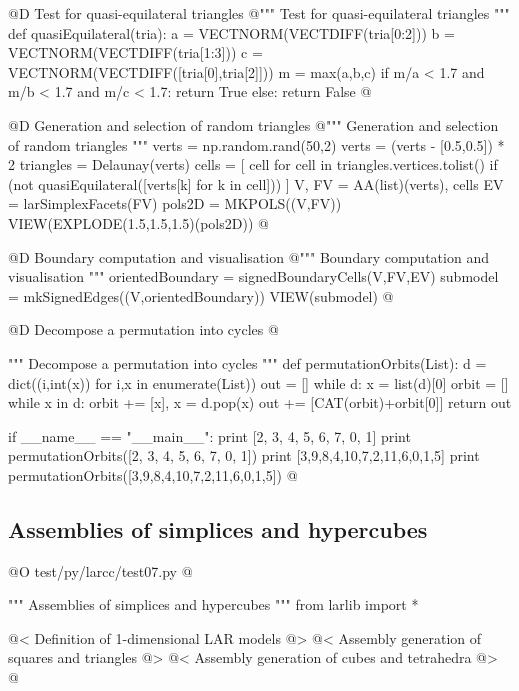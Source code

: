 \documentclass[11pt,oneside]{article}	%
\begin{document}
@D Test for quasi-equilateral triangles
@{""" Test for quasi-equilateral triangles """
def quasiEquilateral(tria):
	a = VECTNORM(VECTDIFF(tria[0:2]))
	b = VECTNORM(VECTDIFF(tria[1:3]))
	c = VECTNORM(VECTDIFF([tria[0],tria[2]]))
	m = max(a,b,c)
	if m/a < 1.7 and m/b < 1.7 and m/c < 1.7: return True
	else: return False
@}

@D Generation and selection of random triangles 
@{""" Generation and selection of random triangles """
verts = np.random.rand(50,2)
verts = (verts - [0.5,0.5]) * 2
triangles = Delaunay(verts)
cells = [ cell for cell in triangles.vertices.tolist()
		 if (not quasiEquilateral([verts[k] for k in cell])) ]
V, FV = AA(list)(verts), cells
EV = larSimplexFacets(FV)
pols2D = MKPOLS((V,FV))
VIEW(EXPLODE(1.5,1.5,1.5)(pols2D))
@}

@D Boundary computation and visualisation 
@{""" Boundary computation and visualisation """
orientedBoundary = signedBoundaryCells(V,FV,EV)
submodel = mkSignedEdges((V,orientedBoundary))
VIEW(submodel)
@}


@D Decompose a permutation into cycles 
@{""" Decompose a permutation into cycles """
def permutationOrbits(List):
	d = dict((i,int(x)) for i,x in enumerate(List))
	out = []
	while d:
		x = list(d)[0]
		orbit = []
		while x in d:
			orbit += [x],
			x = d.pop(x)
		out += [CAT(orbit)+orbit[0]]
	return out
		
if __name__ == "__main__":
	print [2, 3, 4, 5, 6, 7, 0, 1]
	print permutationOrbits([2, 3, 4, 5, 6, 7, 0, 1])
	print [3,9,8,4,10,7,2,11,6,0,1,5]
	print permutationOrbits([3,9,8,4,10,7,2,11,6,0,1,5])
@}

\subsection{Assemblies of simplices and hypercubes}

@O test/py/larcc/test07.py
@{""" Assemblies of simplices and hypercubes """
from larlib import *

@< Definition of 1-dimensional LAR models @>
@< Assembly generation of squares and triangles @>
@< Assembly generation  of cubes and tetrahedra @>
@}
\end{document}
